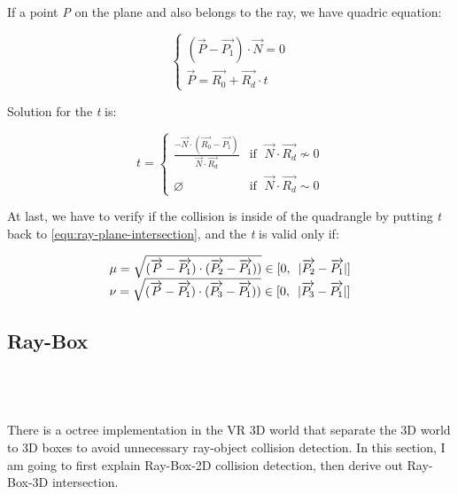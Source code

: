 If a point \emph{P} on the plane and also belongs to the ray, we have quadric equation:

\begin{equation}\label{equ:ray-plane-intersection}
\left\{
\begin{array}{lr}
(\overrightarrow{P} - \overrightarrow{P_1}) \cdot \overrightarrow{N} = 0 \\
\overrightarrow{P} = \overrightarrow{R_0} + \overrightarrow{R_d} \cdot t
\end{array}
\right.
\end{equation}

Solution for the \emph{t} is:

\[
t =
\begin{cases}
\frac{-\overrightarrow{N} \cdot (\overrightarrow{R_0} - \overrightarrow{P_1})}{\overrightarrow{N} \cdot \overrightarrow{R_d}} & \text{if }\;\overrightarrow{N} \cdot \overrightarrow{R_d} \nsim 0 \\
\varnothing & \text{if }\;\overrightarrow{N} \cdot \overrightarrow{R_d} \sim 0
\end{cases}
\]

At last, we have to verify if the collision is inside of the quadrangle by putting \emph{t} back to \ref{equ:ray-plane-intersection}, and the \emph{t} is valid only if:

\[
\begin{array}{lr}
\mu = \sqrt{(\overrightarrow{P} - \overrightarrow{P_1}) \cdot (\overrightarrow{P_2} - \overrightarrow{P_1}))} \in [0,\enspace\lvert \overrightarrow{P_2} - \overrightarrow{P_1} \rvert] \\
\nu = \sqrt{(\overrightarrow{P} - \overrightarrow{P_1}) \cdot (\overrightarrow{P_3} - \overrightarrow{P_1}))} \in [0,\enspace\lvert \overrightarrow{P_3} - \overrightarrow{P_1} \rvert] 
\end{array}
\]

\subsection{Ray-Box}
\parencite{Williams.ray-box.2005} \\
\parencite{Tavian.ray-box-2d.2011} \\
\parencite{scratchapixel.ray-plane-3d} \\

There is a octree implementation in the VR 3D world that separate the 3D world to 3D boxes to avoid unnecessary ray-object collision detection. In this section, I am going to first explain Ray-Box-2D collision detection, then derive out Ray-Box-3D intersection.

